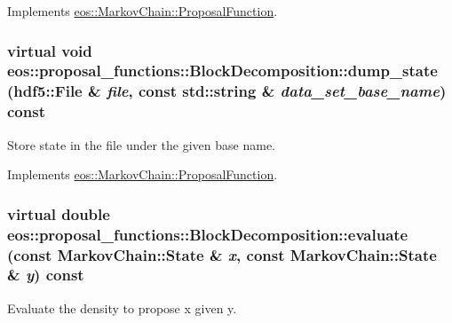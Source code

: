 Implements \hyperlink{structeos_1_1MarkovChain_1_1ProposalFunction_a7065079985f8bb44309d7773d85d225b}{eos::MarkovChain::ProposalFunction}.\hypertarget{classeos_1_1proposal__functions_1_1BlockDecomposition_a6e35abd9d5995d4ce8cd931df9037034}{
\subsubsection[{dump\_\-state}]{\setlength{\rightskip}{0pt plus 5cm}virtual void eos::proposal\_\-functions::BlockDecomposition::dump\_\-state ({\bf hdf5::File} \& {\em file}, \/  const std::string \& {\em data\_\-set\_\-base\_\-name}) const}}
\label{classeos_1_1proposal__functions_1_1BlockDecomposition_a6e35abd9d5995d4ce8cd931df9037034}


Store state in the file under the given base name. 

Implements \hyperlink{structeos_1_1MarkovChain_1_1ProposalFunction_aea88a1340e10cc6a5b03d8b5483774f7}{eos::MarkovChain::ProposalFunction}.\hypertarget{classeos_1_1proposal__functions_1_1BlockDecomposition_a2ccb90e87ccd98a155af6ecd71e03cf5}{
\subsubsection[{evaluate}]{\setlength{\rightskip}{0pt plus 5cm}virtual double eos::proposal\_\-functions::BlockDecomposition::evaluate (const {\bf MarkovChain::State} \& {\em x}, \/  const {\bf MarkovChain::State} \& {\em y}) const}}
\label{classeos_1_1proposal__functions_1_1BlockDecomposition_a2ccb90e87ccd98a155af6ecd71e03cf5}


Evaluate the density to propose x given y. 

